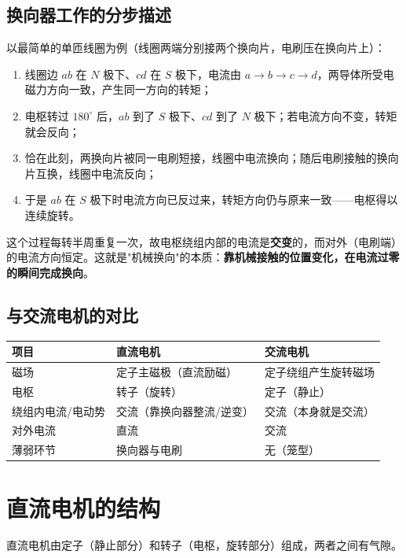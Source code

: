 \subsection{换向器工作的分步描述}
以最简单的单匝线圈为例（线圈两端分别接两个换向片，电刷压在换向片上）：
\begin{enumerate}
  \item 线圈边 $ab$ 在 $N$ 极下、$cd$ 在 $S$ 极下，电流由 $a\to b\to c\to d$，两导体所受电磁力方向一致，产生同一方向的转矩；
  \item 电枢转过 $180^\circ$ 后，$ab$ 到了 $S$ 极下、$cd$ 到了 $N$ 极下；若电流方向不变，转矩就会反向；
  \item 恰在此刻，两换向片被同一电刷短接，线圈中电流换向；随后电刷接触的换向片互换，线圈中电流反向；
  \item 于是 $ab$ 在 $S$ 极下时电流方向已反过来，转矩方向仍与原来一致——电枢得以连续旋转。
\end{enumerate}
这个过程每转半周重复一次，故电枢绕组内部的电流是\textbf{交变}的，而对外（电刷端）的电流方向恒定。这就是"机械换向"的本质：\textbf{靠机械接触的位置变化，在电流过零的瞬间完成换向}。

\subsection{与交流电机的对比}
\begin{center}
\begin{tabular}{@{}p{2.4cm}p{4.4cm}p{4.4cm}@{}}
\toprule
项目 & 直流电机 & 交流电机 \\
\midrule
磁场 & 定子主磁极（直流励磁） & 定子绕组产生旋转磁场 \\
电枢 & 转子（旋转） & 定子（静止） \\
绕组内电流/电动势 & 交流（靠换向器整流/逆变） & 交流（本身就是交流） \\
对外电流 & 直流 & 交流 \\
薄弱环节 & 换向器与电刷 & 无（笼型） \\
\bottomrule
\end{tabular}
\end{center}

\section{直流电机的结构}

直流电机由定子（静止部分）和转子（电枢，旋转部分）组成，两者之间有气隙。

